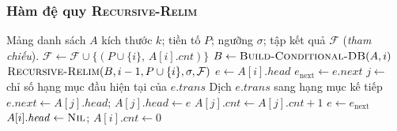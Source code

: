 \documentclass[12pt,a4paper]{report}
\begin{document}
\subsubsection*{Hàm đệ quy \textsc{Recursive-Relim}}


\begin{algorithm}[H]
\caption{\textsc{Recursive-Relim}: hàm đệ quy lõi}
\label{alg:relim-recursive}
\begin{algorithmic}[1]
\REQUIRE Mảng danh sách $A$ kích thước $k$; tiền tố $P$; ngưỡng $\sigma$;
         tập kết quả $\mathcal{F}$ (\textit{tham chiếu}).
        \STATE $\mathcal{F} \leftarrow \mathcal{F} \cup
               \{(P \cup \{i\}, \, A[i].\mathit{cnt})\}$
               \label{line:output}
        \STATE $B \leftarrow \textsc{Build-Conditional-DB}(A, i)$
               \label{line:buildcond}
        \STATE $\textsc{Recursive-Relim}(B, i-1, P \cup \{i\}, \sigma, \mathcal{F})$
               \label{line:recurse}
    \ENDIF
    \STATE $e \leftarrow A[i].\mathit{head}$
        \STATE $e_{\text{next}} \leftarrow e.\mathit{next}$
            \STATE $j \leftarrow$ chỉ số hạng mục đầu hiện tại của $e.\mathit{trans}$
            \STATE Dịch $e.\mathit{trans}$ sang hạng mục kế tiếp 
                \STATE $e.\mathit{next} \leftarrow A[j].\mathit{head}$;
                       $A[j].\mathit{head} \leftarrow e$
            \ENDIF
            \STATE $A[j].\mathit{cnt} \leftarrow A[j].\mathit{cnt} + 1$
        \ENDIF
        \STATE $e \leftarrow e_{\text{next}}$
    \ENDWHILE
    \STATE $A[i].\mathit{head} \leftarrow \textsc{Nil}$;\;
           $A[i].\mathit{cnt} \leftarrow 0$ 
\ENDFOR
\end{algorithmic}
\end{algorithm}
\end{document}
